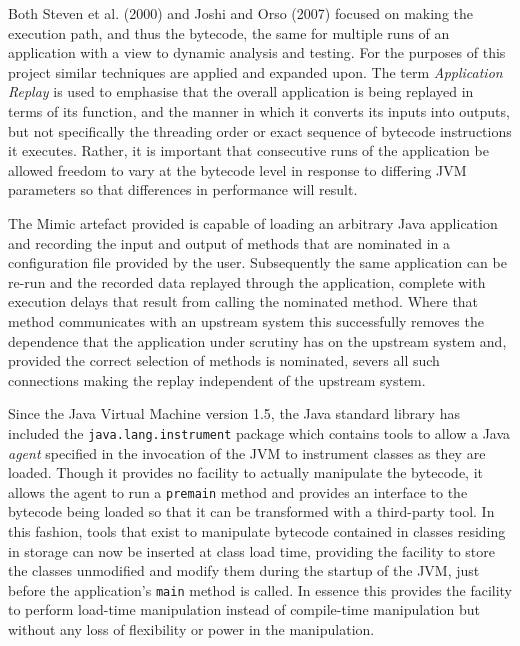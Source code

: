 \documentclass[]{final_report}
\begin{document}
Both Steven et al. (2000) \cite{steven:2000} and Joshi and Orso (2007) \cite{joshi:2007} focused on making the execution path, and thus the bytecode, the same for multiple runs of an application with a view to dynamic analysis and testing. For the purposes of this project similar techniques are applied and expanded upon. The term \textit{Application Replay} is used to emphasise that the overall application is being replayed in terms of its function, and the manner in which it converts its inputs into outputs, but not specifically the threading order or exact sequence of bytecode instructions it executes. Rather, it is important that consecutive runs of the application be allowed freedom to vary at the bytecode level in response to differing JVM parameters so that differences in performance will result.

The Mimic artefact provided is capable of loading an arbitrary Java application and recording the input and output of methods that are nominated in a configuration file provided by the user. Subsequently the same application can be re-run and the recorded data replayed through the application, complete with execution delays that result from calling the nominated method. Where that method communicates with an upstream system this successfully removes the dependence that the application under scrutiny has on the upstream system and, provided the correct selection of methods is nominated, severs all such connections making the replay independent of the upstream system.

Since the Java Virtual Machine version 1.5, the Java standard library has included the \linebreak[4] \lstinline{java.lang.instrument}\noop{} package which contains tools to allow a Java \textit{agent} specified in the invocation of the JVM to instrument classes as they are loaded. Though it provides no facility to actually manipulate the bytecode, it allows the agent to run a \lstinline{premain}\noop{} method and provides an interface to the bytecode being loaded so that it can be transformed with a third-party tool. In this fashion, tools that exist to manipulate bytecode contained in classes residing in storage can now be inserted at class load time, providing the facility to store the classes unmodified and modify them during the startup of the JVM, just before the application's \lstinline{main}\noop{} method is called. In essence this provides the facility to perform load-time manipulation instead of compile-time manipulation but without any loss of flexibility or power in the manipulation.
\end{document}
